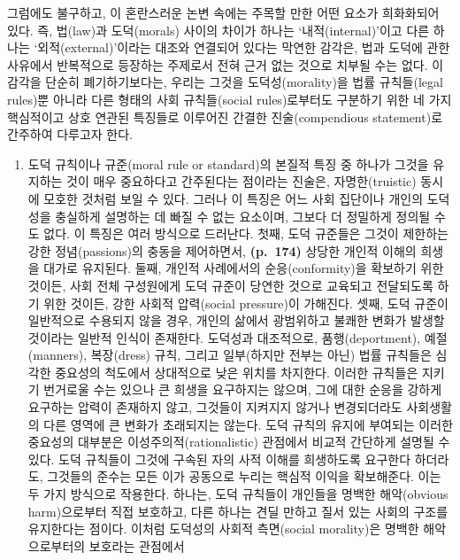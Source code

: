 그럼에도 불구하고, 이 혼란스러운 논변 속에는 주목할 만한 어떤 요소가
희화화되어 있다. 즉, 법(law)과 도덕(morals) 사이의 차이가 하나는
`내적(internal)'이고 다른 하나는 `외적(external)'이라는 대조와 연결되어
있다는 막연한 감각은, 법과 도덕에 관한 사유에서 반복적으로 등장하는
주제로서 전혀 근거 없는 것으로 치부될 수는 없다. 이 감각을 단순히
폐기하기보다는, 우리는 그것을 도덕성(morality)을 법률 규칙들(legal
rules)뿐 아니라 다른 형태의 사회 규칙들(social rules)로부터도 구분하기
위한 네 가지 핵심적이고 상호 연관된 특징들로 이루어진 간결한
진술(compendious statement)로 간주하여 다루고자 한다.

\begin{enumerate}
\def\labelenumi{(\roman{enumi})}
\tightlist
\item
   도덕 규칙이나 규준(moral rule or
  standard)의 본질적 특징 중 하나가 그것을 유지하는 것이 매우 중요하다고
  간주된다는 점이라는 진술은, 자명한(truistic) 동시에 모호한 것처럼 보일
  수 있다. 그러나 이 특징은 어느 사회 집단이나 개인의 도덕성을 충실하게
  설명하는 데 빠질 수 없는 요소이며, 그보다 더 정밀하게 정의될 수도
  없다. 이 특징은 여러 방식으로 드러난다. 첫째, 도덕 규준들은 그것이
  제한하는 강한 정념(passions)의 충동을 제어하면서, \textbf{(p.~174)}
  상당한 개인적 이해의 희생을 대가로 유지된다. 둘째, 개인적 사례에서의
  순응(conformity)을 확보하기 위한 것이든, 사회 전체 구성원에게 도덕
  규준이 당연한 것으로 교육되고 전달되도록 하기 위한 것이든, 강한 사회적
  압력(social pressure)이 가해진다. 셋째, 도덕 규준이 일반적으로
  수용되지 않을 경우, 개인의 삶에서 광범위하고 불쾌한 변화가 발생할
  것이라는 일반적 인식이 존재한다. 도덕성과 대조적으로,
  품행(deportment), 예절(manners), 복장(dress) 규칙, 그리고 일부(하지만
  전부는 아닌) 법률 규칙들은 심각한 중요성의 척도에서 상대적으로 낮은
  위치를 차지한다. 이러한 규칙들은 지키기 번거로울 수는 있으나 큰 희생을
  요구하지는 않으며, 그에 대한 순응을 강하게 요구하는 압력이 존재하지
  않고, 그것들이 지켜지지 않거나 변경되더라도 사회생활의 다른 영역에 큰
  변화가 초래되지는 않는다. 도덕 규칙의 유지에 부여되는 이러한 중요성의
  대부분은 이성주의적(rationalistic) 관점에서 비교적 간단하게 설명될 수
  있다. 도덕 규칙들이 그것에 구속된 자의 사적 이해를 희생하도록 요구한다
  하더라도, 그것들의 준수는 모든 이가 공동으로 누리는 핵심적 이익을
  확보해준다. 이는 두 가지 방식으로 작용한다. 하나는, 도덕 규칙들이
  개인들을 명백한 해악(obvious harm)으로부터 직접 보호하고, 다른 하나는
  견딜 만하고 질서 있는 사회의 구조를 유지한다는 점이다. 이처럼 도덕성의
  사회적 측면(social morality)은 명백한 해악으로부터의 보호라는 관점에서

\end{enumerate}
